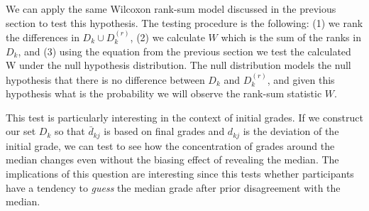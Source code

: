 We can apply the same Wilcoxon rank-sum model discussed in the previous section to test this hypothesis.
The testing procedure is the following: (1) we rank the differences in $D_k \cup D_k^{(r)}$, (2) we calculate $W$ which is the sum of the ranks in $D_k$, and 
(3) using the equation from the previous section we test the calculated W under the null hypothesis distribution.
The null distribution models the null hypothesis that there is no difference between $D_k$ and $D_k^{(r)}$, and given this hypothesis what is the probability we will observe the rank-sum statistic $W$.

This test is particularly interesting in the context of initial grades.
If we construct our set $D_k$ so that $\bar{d}_{kj}$ is based on final grades and $d_{kj}$ is the deviation of the initial grade, we can test to see how the concentration of grades around the median changes even without the biasing effect of revealing the median.
The implications of this question are interesting since this tests whether participants have a tendency to \emph{guess} the median grade after prior disagreement with the median.
